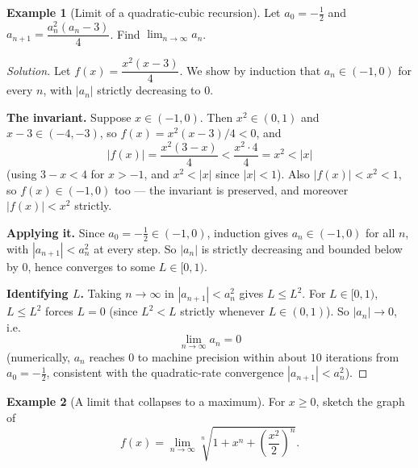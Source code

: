 \documentclass[11pt]{article}
\theoremstyle{definition}
\newtheorem{example}{Example}[section]
\begin{document}
\begin{example}[Limit of a quadratic-cubic recursion]
Let $a_0=-\tfrac12$ and $a_{n+1}=\dfrac{a_n^2(a_n-3)}4$. Find $\lim_{n\to\infty}a_n$.
\end{example}

\begin{proof}[Solution]
Let $f(x)=\dfrac{x^2(x-3)}4$. We show by induction that $a_n\in(-1,0)$ for every $n$, with $|a_n|$ strictly decreasing to $0$.

\textbf{The invariant.} Suppose $x\in(-1,0)$. Then $x^2\in(0,1)$ and $x-3\in(-4,-3)$, so $f(x)=x^2(x-3)/4<0$, and
\[
|f(x)|=\frac{x^2(3-x)}4<\frac{x^2\cdot4}4=x^2<|x|
\]
(using $3-x<4$ for $x>-1$, and $x^2<|x|$ since $|x|<1$). Also $|f(x)|<x^2<1$, so $f(x)\in(-1,0)$ too — the invariant is preserved, and moreover $|f(x)|<x^2$ strictly.

\textbf{Applying it.} Since $a_0=-\tfrac12\in(-1,0)$, induction gives $a_n\in(-1,0)$ for all $n$, with $|a_{n+1}|<a_n^2$ at every step. So $|a_n|$ is strictly decreasing and bounded below by $0$, hence converges to some $L\in[0,1)$.

\textbf{Identifying $L$.} Taking $n\to\infty$ in $|a_{n+1}|<a_n^2$ gives $L\le L^2$. For $L\in[0,1)$, $L\le L^2$ forces $L=0$ (since $L^2<L$ strictly whenever $L\in(0,1)$). So $|a_n|\to0$, i.e.\
\[
\boxed{\lim_{n\to\infty}a_n=0}
\]
(numerically, $a_n$ reaches $0$ to machine precision within about $10$ iterations from $a_0=-\tfrac12$, consistent with the quadratic-rate convergence $|a_{n+1}|<a_n^2$).
\end{proof}

\begin{example}[A limit that collapses to a maximum]
For $x\ge0$, sketch the graph of
\[
f(x)=\lim_{n\to\infty}\sqrt[n]{1+x^n+\left(\frac{x^2}2\right)^n}.
\]
\end{example}
\end{document}
